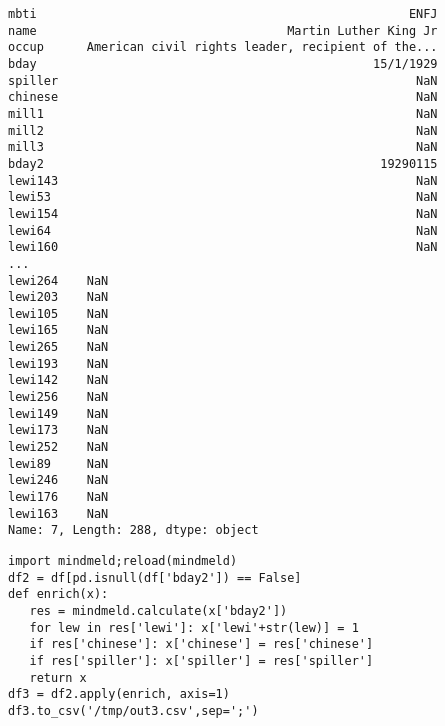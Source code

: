 \documentclass[12pt,fleqn]{article}\usepackage{common}
\begin{document}
\begin{verbatim}
mbti                                                    ENFJ
name                                   Martin Luther King Jr
occup      American civil rights leader, recipient of the...
bday                                               15/1/1929
spiller                                                  NaN
chinese                                                  NaN
mill1                                                    NaN
mill2                                                    NaN
mill3                                                    NaN
bday2                                               19290115
lewi143                                                  NaN
lewi53                                                   NaN
lewi154                                                  NaN
lewi64                                                   NaN
lewi160                                                  NaN
...
lewi264    NaN
lewi203    NaN
lewi105    NaN
lewi165    NaN
lewi265    NaN
lewi193    NaN
lewi142    NaN
lewi256    NaN
lewi149    NaN
lewi173    NaN
lewi252    NaN
lewi89     NaN
lewi246    NaN
lewi176    NaN
lewi163    NaN
Name: 7, Length: 288, dtype: object
\end{verbatim}


\begin{verbatim}
import mindmeld;reload(mindmeld)
df2 = df[pd.isnull(df['bday2']) == False]
def enrich(x):
   res = mindmeld.calculate(x['bday2'])
   for lew in res['lewi']: x['lewi'+str(lew)] = 1
   if res['chinese']: x['chinese'] = res['chinese']
   if res['spiller']: x['spiller'] = res['spiller']
   return x
df3 = df2.apply(enrich, axis=1)
df3.to_csv('/tmp/out3.csv',sep=';')
\end{verbatim}
\end{document}
